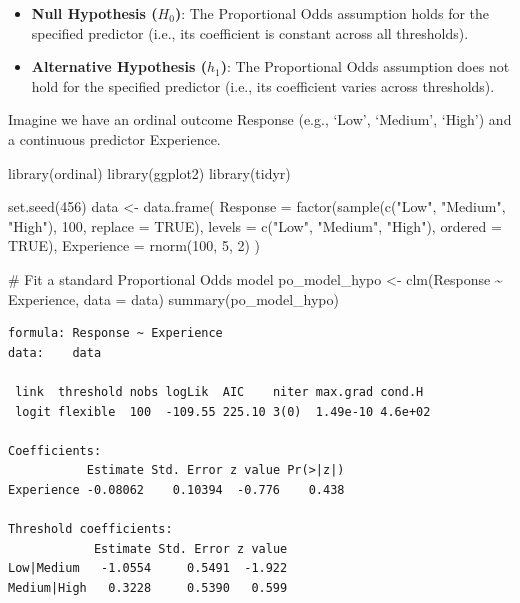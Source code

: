 \documentclass[
  letterpaper,
  DIV=11,
  numbers=noendperiod]{scrartcl}
\newenvironment{Shaded}{\begin{snugshade}}{\end{snugshade}}
\newcommand{\AttributeTok}[1]{\textcolor[rgb]{0.40,0.45,0.13}{#1}}
\newcommand{\CommentTok}[1]{\textcolor[rgb]{0.37,0.37,0.37}{#1}}
\newcommand{\ConstantTok}[1]{\textcolor[rgb]{0.56,0.35,0.01}{#1}}
\newcommand{\DecValTok}[1]{\textcolor[rgb]{0.68,0.00,0.00}{#1}}
\newcommand{\FunctionTok}[1]{\textcolor[rgb]{0.28,0.35,0.67}{#1}}
\newcommand{\NormalTok}[1]{\textcolor[rgb]{0.00,0.23,0.31}{#1}}
\newcommand{\OtherTok}[1]{\textcolor[rgb]{0.00,0.23,0.31}{#1}}
\newcommand{\SpecialCharTok}[1]{\textcolor[rgb]{0.37,0.37,0.37}{#1}}
\newcommand{\StringTok}[1]{\textcolor[rgb]{0.13,0.47,0.30}{#1}}
\begin{document}
\begin{itemize}
\item
  \textbf{Null Hypothesis (\(H_0\))}: The Proportional Odds assumption
  holds for the specified predictor (i.e., its coefficient is constant
  across all thresholds).
\item
  \textbf{Alternative Hypothesis (\(h_1\))}: The Proportional Odds
  assumption does not hold for the specified predictor (i.e., its
  coefficient varies across thresholds).
\end{itemize}

Imagine we have an ordinal outcome Response (e.g., `Low', `Medium',
`High') and a continuous predictor Experience.

\begin{Shaded}
\begin{Highlighting}[]
\FunctionTok{library}\NormalTok{(ordinal) }
\FunctionTok{library}\NormalTok{(ggplot2) }
\FunctionTok{library}\NormalTok{(tidyr)   }

\FunctionTok{set.seed}\NormalTok{(}\DecValTok{456}\NormalTok{)}
\NormalTok{data }\OtherTok{\textless{}{-}} \FunctionTok{data.frame}\NormalTok{(}
  \AttributeTok{Response =} \FunctionTok{factor}\NormalTok{(}\FunctionTok{sample}\NormalTok{(}\FunctionTok{c}\NormalTok{(}\StringTok{"Low"}\NormalTok{, }\StringTok{"Medium"}\NormalTok{, }\StringTok{"High"}\NormalTok{), }\DecValTok{100}\NormalTok{, }\AttributeTok{replace =} \ConstantTok{TRUE}\NormalTok{),}
                    \AttributeTok{levels =} \FunctionTok{c}\NormalTok{(}\StringTok{"Low"}\NormalTok{, }\StringTok{"Medium"}\NormalTok{, }\StringTok{"High"}\NormalTok{), }\AttributeTok{ordered =} \ConstantTok{TRUE}\NormalTok{),}
  \AttributeTok{Experience =} \FunctionTok{rnorm}\NormalTok{(}\DecValTok{100}\NormalTok{, }\DecValTok{5}\NormalTok{, }\DecValTok{2}\NormalTok{)}
\NormalTok{)}

\CommentTok{\# Fit a standard Proportional Odds model}
\NormalTok{po\_model\_hypo }\OtherTok{\textless{}{-}} \FunctionTok{clm}\NormalTok{(Response }\SpecialCharTok{\textasciitilde{}}\NormalTok{ Experience, }\AttributeTok{data =}\NormalTok{ data)}
\FunctionTok{summary}\NormalTok{(po\_model\_hypo)}
\end{Highlighting}
\end{Shaded}

\begin{verbatim}
formula: Response ~ Experience
data:    data

 link  threshold nobs logLik  AIC    niter max.grad cond.H 
 logit flexible  100  -109.55 225.10 3(0)  1.49e-10 4.6e+02

Coefficients:
           Estimate Std. Error z value Pr(>|z|)
Experience -0.08062    0.10394  -0.776    0.438

Threshold coefficients:
            Estimate Std. Error z value
Low|Medium   -1.0554     0.5491  -1.922
Medium|High   0.3228     0.5390   0.599
\end{verbatim}
\end{document}
